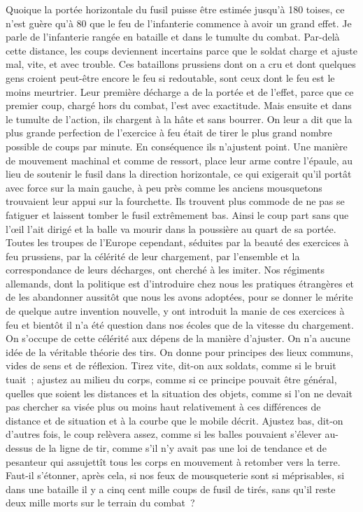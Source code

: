 \documentclass[french,twoside]{book} %
\begin{document}
Quoique la portée horizontale du fusil puisse être estimée jusqu’à 180 toises, ce n’est guère qu’à 80 que le feu de l’infanterie commence à avoir un grand effet. Je parle de l’infanterie rangée en bataille et dans le tumulte du combat. Par-delà cette distance, les coups deviennent incertains parce que le soldat charge et ajuste mal, vite, et avec trouble. Ces bataillons prussiens dont on a cru et dont quelques gens croient peut-être encore le feu si redoutable, sont ceux dont le feu est le moins meurtrier. Leur première décharge a de la portée et de l’effet, parce que ce premier coup, chargé hors du combat, l’est avec exactitude. Mais ensuite et dans le tumulte de l’action, ils chargent à la hâte et sans bourrer. On leur a dit que la plus grande perfection de l’exercice à feu était de tirer le plus grand nombre possible de coups par minute. En conséquence ils n’ajustent point. Une manière de mouvement machinal et comme de ressort, place leur arme contre l’épaule, au lieu de soutenir le fusil dans la direction horizontale, ce qui exigerait qu’il portât avec force sur la main gauche, à peu près comme les anciens mousquetons trouvaient leur appui sur la fourchette. Ils trouvent plus commode de ne pas se fatiguer et laissent tomber le fusil extrêmement bas. Ainsi le coup part sans que l’œil l’ait dirigé et la balle va mourir dans la poussière au quart de sa portée. Toutes les troupes de l’Europe cependant, séduites par la beauté des exercices à feu prussiens, par la célérité de leur chargement, par l’ensemble et la correspondance de leurs décharges, ont cherché à les imiter. Nos régiments allemands, dont la politique est d’introduire chez nous les pratiques étrangères et de les abandonner aussitôt que nous les avons adoptées, pour se donner le mérite de quelque autre invention nouvelle, y ont introduit la manie de ces exercices à feu et bientôt il n’a été question dans nos écoles que de la vitesse du chargement. On s’occupe de cette célérité aux dépens de la manière d’ajuster. On n’a aucune idée de la véritable théorie des tirs. On donne pour principes des lieux communs, vides de sens et de réflexion. Tirez vite, dit-on aux soldats, comme si le bruit tuait ; ajustez au milieu du corps, comme si ce principe pouvait être général, quelles que soient les distances et la situation des objets, comme si l’on ne devait pas chercher sa visée plus ou moins haut relativement à ces différences de distance et de situation et à la courbe que le mobile décrit. Ajustez bas, dit-on d’autres fois, le coup relèvera assez, comme si les balles pouvaient s’élever au-dessus de la ligne de tir, comme s’il n’y avait pas une loi de tendance et de pesanteur qui assujettît tous les corps en mouvement à retomber vers la terre. Faut-il s’étonner, après cela, si nos feux de mousqueterie sont si méprisables, si dans une bataille il y a cinq cent mille coups de fusil de tirés, sans qu’il reste deux mille morts sur le terrain du combat ?\par
\end{document}
